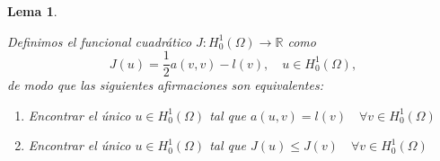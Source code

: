 \documentclass[a4paper,11pt,spanish, twoside, leqno]{tfg-uam}
\newtheorem{lema}[teor]{Lema}
\theoremstyle{definition}
\begin{document}
\begin{lema} \label{lema:MinimoFuncion}
    
    Definimos el funcional cuadrático $J: H_0^1(\Omega) \to \mathbb{R}$ como
    \begin{equation*}
        J(u) = \frac{1}{2}a(v,v) - l(v), \quad u\in H_0^1(\Omega),
    \end{equation*}
    de modo que las siguientes afirmaciones son equivalentes:
    \begin{enumerate}
        \item Encontrar el único $u\in H_0^1(\Omega)$ tal que $a(u,v) = l(v) \quad \forall v\in H_0^1(\Omega)$
        \item Encontrar el único $u\in H_0^1(\Omega)$ tal que $J(u) \leq J(v) \quad \forall v\in H_0^1(\Omega)$
    \end{enumerate}
\end{lema}
\end{document}
